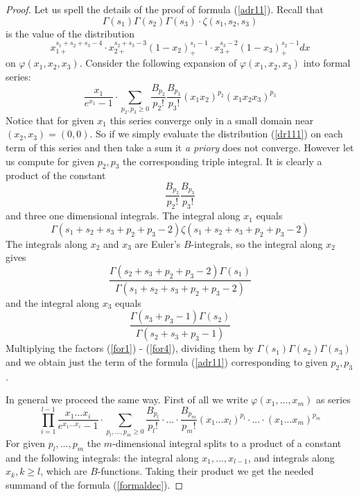 \documentclass[10pt]{article}
\begin{document}
\begin{proof} Let us spell  the details  of the 
 proof of formula (\ref{adr11}). Recall that
$$ 
 \Gamma(s_1)\Gamma(s_2)\Gamma(s_3) \cdot \zeta(s_1,s_2,s_3) 
$$
is the value of the distribution
 \begin{equation} \label{dr111}
x^{s_1 + s_2 + s_3 -4}_{1+} \cdot  x_{2+}^{s_2 + s_3-3}  (1-x_2)_+^{s_1-1} \cdot x_{3+}^{s_3-2}(1-x_3)_+^{s_2-1}dx 
 \end{equation}
on $\varphi(x_1,x_2,x_3)$. Consider the following expansion of $\varphi(x_1,x_2,x_3)$ into formal   series:
\begin{equation} \label{dr333} 
 \frac{x_1}{e^{x_1}-1}\cdot \sum_{p_2,p_3 \geq 0}\frac{B_{p_2}}{p_2!}\frac{B_{p_3}}{p_3!} (x_1x_2)^{p_2 }(x_1x_2x_3)^{p_3}
\end{equation} 
Notice that for given $x_1$ this series converge  only in a small domain near $(x_2,x_3)=(0,0)$. So if we simply evaluate the distribution (\ref{dr111}) 
on each term of this series and then take a sum it  {\it a priory} 
does not converge. 
However  let us compute for given $p_2,p_3$ the corresponding triple integral.  It is clearly a product of the constant  
\begin{equation} \label{for1}
\frac{B_{p_2}}{p_2!}\frac{B_{p_3}}{p_3!}
\end{equation}
 and  three one dimensional integrals.  The integral along $x_1$ equals
\begin{equation} \label{for2}
\Gamma(s_1 + s_2 + s_3 + p_2 + p_3 -  2) \zeta(s_1 + s_2 + s_3 + p_2 + p_3 -  2)
\end{equation}
The integrals along $x_2$  and $x_3$ are Euler's $B$-integrals, so the integral along $x_2$ gives
\begin{equation} \label{for3}
\frac{\Gamma(s_2 + s_3 + p_2 + p_3 -2)\Gamma(s_1)}{\Gamma(s_1 + s_2 + s_3 + p_2 + p_3 -2)}
\end{equation}
and the integral along $x_3$ equals
\begin{equation} \label{for4}
\frac{\Gamma(s_3+ p_3 -1)\Gamma(s_2)}{\Gamma(s_2+ s_3 +p_3 -1)}
\end{equation} 
 Multiplying the  factors  (\ref{for1}) - (\ref{for4}), dividing them by $\Gamma(s_1)\Gamma(s_2)\Gamma(s_3)$ and   we  obtain just the term   of the formula (\ref{adr11}) corresponding to given $p_2,p_3$. 
 
In general we proceed the same way. First of all we  write $\varphi(x_1,...,x_m)$  as series 
$$
   \prod_{i=1}^{l-1} \frac{x_1   ...   x_i}{e^{x_1   ...   x_i}-1} \cdot \sum_{p_{l},...,p_m \geq 0} \frac{B_{p_l}}{p_l!}\cdot ... \cdot \frac{B_{p_m}}{p_m!}(x_1   ...   x_l)^{p_l} \cdot ... \cdot (x_1 ... x_m)^{p_m}
$$
For given $p_l,...,p_m$ the $m$-dimensional integral splits to a product of
a constant  and the following  integrals: the integral along $x_1,...,x_{l-1}$, and 
integrals along $x_k, k \geq l$,  which are $B$-functions.
Taking their product we get  the needed summand of the  formula (\ref{formaldec}).


\end{proof}
\end{document}
